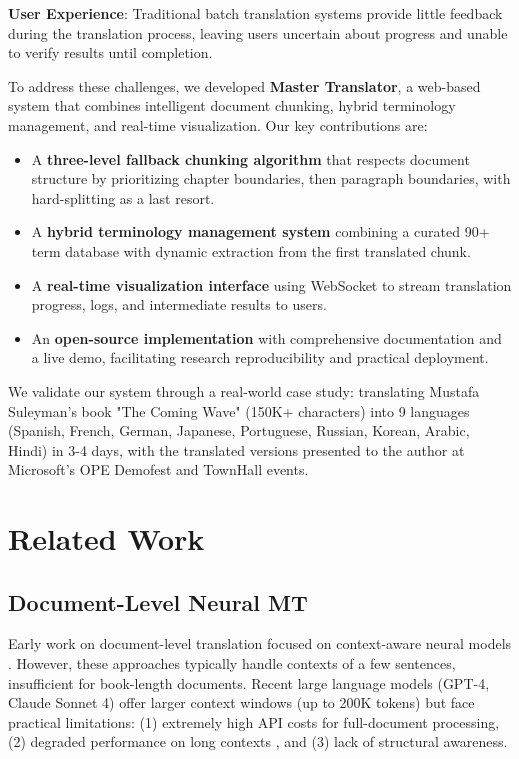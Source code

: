 \documentclass[11pt]{article}
\begin{document}
\textbf{User Experience}: Traditional batch translation systems provide little feedback during the translation process, leaving users uncertain about progress and unable to verify results until completion.

To address these challenges, we developed \textbf{Master Translator}, a web-based system that combines intelligent document chunking, hybrid terminology management, and real-time visualization. Our key contributions are:

\begin{itemize}
    \item A \textbf{three-level fallback chunking algorithm} that respects document structure by prioritizing chapter boundaries, then paragraph boundaries, with hard-splitting as a last resort.
    \item A \textbf{hybrid terminology management system} combining a curated 90+ term database with dynamic extraction from the first translated chunk.
    \item A \textbf{real-time visualization interface} using WebSocket to stream translation progress, logs, and intermediate results to users.
    \item An \textbf{open-source implementation} with comprehensive documentation and a live demo, facilitating research reproducibility and practical deployment.
\end{itemize}

We validate our system through a real-world case study: translating Mustafa Suleyman's book "The Coming Wave" (150K+ characters) into 9 languages (Spanish, French, German, Japanese, Portuguese, Russian, Korean, Arabic, Hindi) in 3-4 days, with the translated versions presented to the author at Microsoft's OPE Demofest and TownHall events.

\section{Related Work}

\subsection{Document-Level Neural MT}

Early work on document-level translation focused on context-aware neural models \cite{jean2017does,zhang2018improving}. However, these approaches typically handle contexts of a few sentences, insufficient for book-length documents. Recent large language models (GPT-4, Claude Sonnet 4) offer larger context windows (up to 200K tokens) but face practical limitations: (1) extremely high API costs for full-document processing, (2) degraded performance on long contexts \cite{liu2023lost}, and (3) lack of structural awareness.
\end{document}
